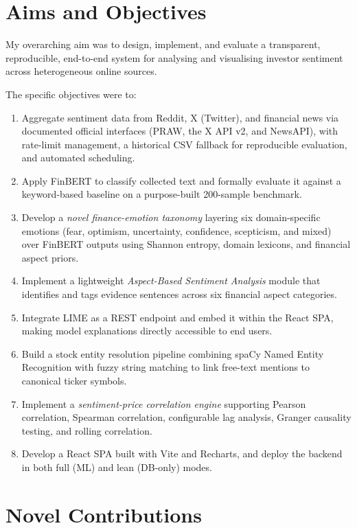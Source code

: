 \section{Aims and Objectives}
\label{sec:aims_objectives}

My overarching aim was to design, implement, and evaluate a transparent,
reproducible, end-to-end system for analysing and visualising investor sentiment
across heterogeneous online sources.

The specific objectives were to:

\begin{enumerate}
    \item Aggregate sentiment data from Reddit, X (Twitter), and financial news
    via documented official interfaces (PRAW, the X API v2, and NewsAPI), with
    rate-limit management, a historical CSV fallback for reproducible
    evaluation, and automated scheduling.
    \item Apply FinBERT to classify collected text and formally evaluate it against
    a keyword-based baseline on a purpose-built 200-sample benchmark.
    \item Develop a \textit{novel finance-emotion taxonomy} layering six
    domain-specific emotions (fear, optimism, uncertainty, confidence, scepticism,
    and mixed) over FinBERT outputs using Shannon entropy, domain lexicons, and
    financial aspect priors.
    \item Implement a lightweight \textit{Aspect-Based Sentiment Analysis} module
    that identifies and tags evidence sentences across six financial aspect
    categories.
    \item Integrate LIME as a REST endpoint and embed it within the React SPA,
    making model explanations directly accessible to end users.
    \item Build a stock entity resolution pipeline combining spaCy Named Entity
    Recognition with fuzzy string matching to link free-text mentions to canonical
    ticker symbols.
    \item Implement a \textit{sentiment-price correlation engine} supporting
    Pearson correlation, Spearman correlation, configurable lag analysis, Granger
    causality testing, and rolling correlation.
    \item Develop a React SPA built with Vite and Recharts, and deploy the backend
    in both full (ML) and lean (DB-only) modes.
\end{enumerate}

\section{Novel Contributions}
\label{sec:novel_contributions}

